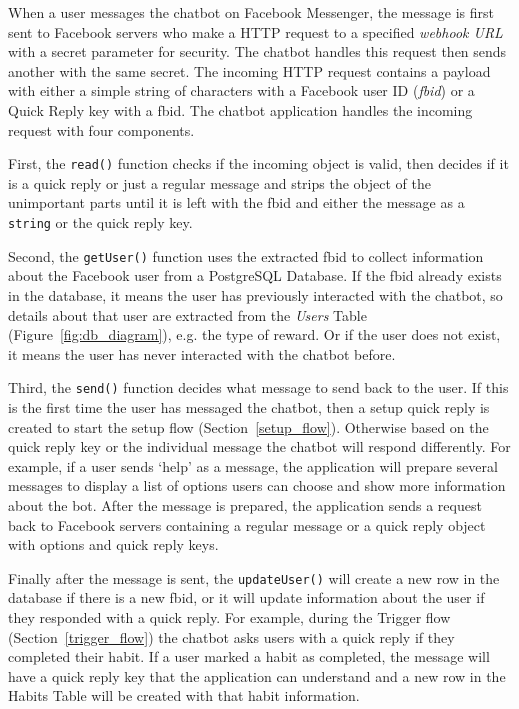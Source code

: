 When a user messages the chatbot on Facebook Messenger, the message is first sent to Facebook servers who make a HTTP request to a specified \textit{webhook URL} with a secret parameter for security. The chatbot handles this request then sends another with the same secret. The incoming HTTP request contains a payload with either a simple string of characters with a Facebook user ID (\textit{fbid}) or a Quick Reply key with a fbid. The chatbot application handles the incoming request with four components.

First, the \verb|read()| function checks if the incoming object is valid, then decides if it is a quick reply or just a regular message and strips the object of the unimportant parts until it is left with the fbid and either the message as a \verb|string| or the quick reply key.

Second, the \verb|getUser()| function uses the extracted fbid to collect information about the Facebook user from a PostgreSQL Database. If the fbid already exists in the database, it means the user has previously interacted with the chatbot, so details about that user are extracted from the \textit{Users} Table (Figure~\ref{fig:db_diagram}), e.g. the type of reward. Or if the user does not exist, it means the user has never interacted with the chatbot before.

Third, the \verb|send()| function decides what message to send back to the user. If this is the first time the user has messaged the chatbot, then a setup quick reply is created to start the setup flow (Section~\ref{setup_flow}). Otherwise based on the quick reply key or the individual message the chatbot will respond differently. For example, if a user sends `help' as a message, the application will prepare several messages to display a list of options users can choose and show more information about the bot. After the message is prepared, the application sends a request back to Facebook servers containing a regular message or a quick reply object with options and quick reply keys.

Finally after the message is sent, the \verb|updateUser()| will create a new row in the database if there is a new fbid, or it will update information about the user if they responded with a quick reply. For example, during the Trigger flow (Section~\ref{trigger_flow}) the chatbot asks users with a quick reply if they completed their habit. If a user marked a habit as completed, the message will have a quick reply key that the application can understand and a new row in the Habits Table will be created with that habit information.

